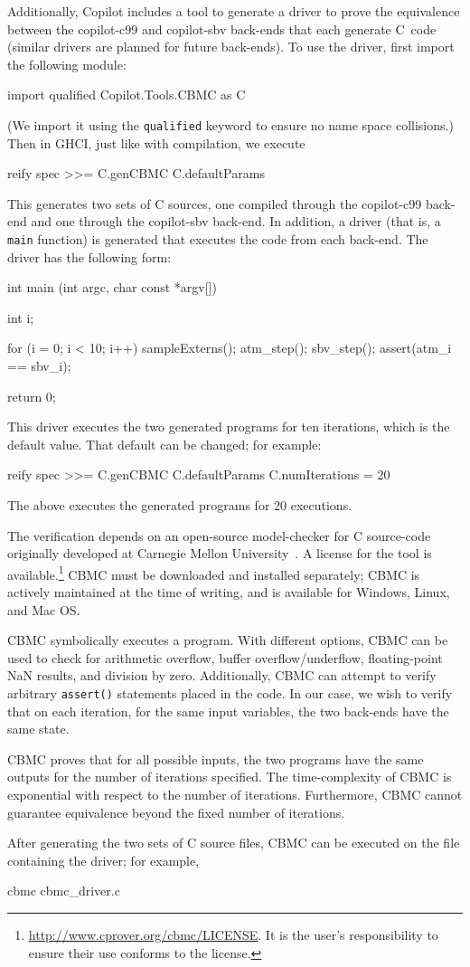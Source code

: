 Additionally, Copilot includes a tool to generate a driver to prove the
equivalence between the copilot-c99 and copilot-sbv back-ends that each generate
C~code (similar drivers are planned for future back-ends).  To use the driver,
first import the following module:
%
\begin{code}
import qualified Copilot.Tools.CBMC as C
\end{code}
%
\noindent
(We import it using the {\tt qualified} keyword to ensure no name space
collisions.)  Then in GHCI, just like with compilation, we execute
%
\begin{code}
reify spec >>= C.genCBMC C.defaultParams  
\end{code}
%
\noindent
This generates two sets of C sources, one compiled through the copilot-c99
back-end and one through the copilot-sbv back-end.  In addition, a driver (that is, a
{\tt main} function) is generated that executes the code from each back-end.  The
driver has the following form:
%
\begin{code}
int main (int argc, char const *argv[])
{
  int i;

  for (i = 0; i < 10; i++)
  {
    sampleExterns();
    atm_step();
    sbv_step();
    assert(atm_i == sbv_i);
  }

  return 0;
}
\end{code}
%
This driver executes the two generated programs for ten iterations, which is the
default value.  That default can be changed; for example:
%
\begin{code}
reify spec >>= 
  C.genCBMC C.defaultParams {C.numIterations = 20}
\end{code}
%
\noindent
The above executes the generated programs for 20 executions.

The verification depends on an open-source model-checker for C source-code
originally developed at Carnegie Mellon University~\cite{cbmc}.  A license for
the tool is available.\footnote{\url{http://www.cprover.org/cbmc/LICENSE}.  It
  is the user's responsibility to ensure their use conforms to the license.}
CBMC must be downloaded and installed separately; CBMC is actively maintained
at the time of writing, and is available for Windows, Linux, and Mac OS.

CBMC symbolically executes a program.  With different options, CBMC can be used
to check for arithmetic overflow, buffer overflow/underflow, floating-point NaN
results, and division by zero.  Additionally, CBMC can attempt to verify
arbitrary {\tt assert()} statements placed in the code.  In our case, we wish to
verify that on each iteration, for the same input variables, the two back-ends
have the same state.  

CBMC proves that for all possible inputs, the two programs have the same outputs
for the number of iterations specified.  The time-complexity of CBMC is
exponential with respect to the number of iterations.  Furthermore, CBMC cannot
guarantee equivalence beyond the fixed number of iterations.

After generating the two sets of C source files, CBMC can be executed on the
file containing the driver; for example,
%
\begin{code}
cbmc cbmc_driver.c  
\end{code}
%
